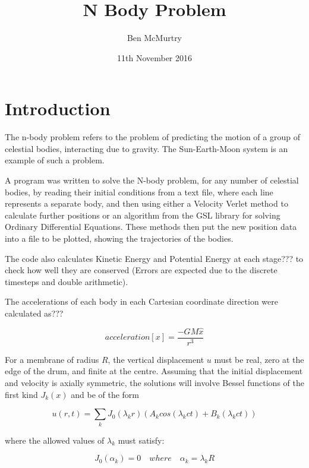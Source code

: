 \documentclass{article}
\begin{document}
\title{N Body Problem} 
\author{Ben McMurtry}
\date{11th November 2016} 	
\maketitle




\section{Introduction}
\label{sec:introduction}

The n-body problem refers to the problem of predicting the motion of a group of celestial bodies, interacting due to gravity. The Sun-Earth-Moon system is an example of such a problem. 

A program was written to solve the N-body problem, for any number of celestial bodies, by reading their initial conditions from a text file, where each line represents a separate body, and then using either a Velocity Verlet method to calculate further positions or an algorithm from the GSL library for solving Ordinary Differential Equations. These methods then put the new position data into a file to be plotted, showing the trajectories of the bodies.

The code also calculates Kinetic Energy and Potential Energy at each stage??? to check how well they are conserved (Errors are expected due to the discrete timesteps and double arithmetic). 

The accelerations of each body in each Cartesian coordinate direction were calculated as???

\begin{equation}
acceleration[x] = \frac{-GM\hat{x}}{r^3}
\end{equation}

For a membrane of radius $R$, the vertical displacement $u$ must be real, zero at the edge of the drum, and finite at the centre. Assuming that the initial displacement and velocity is axially symmetric, the solutions will involve Bessel functions of the first kind $J_{k}(x)$ and be of the form

\begin{equation}
u(r,t) = \sum_{k}J_{0}(\lambda_{k}r)(A_{k}cos(\lambda_{k}ct) + B_{k}(\lambda_{k}ct))
\end{equation}

where the allowed values of $\lambda_{k}$ must satisfy:

\begin{equation}
J_{0}(\alpha_{k}) = 0 \quad where\quad \alpha_{k} = \lambda_{k}R
\end{equation}
\end{document}
